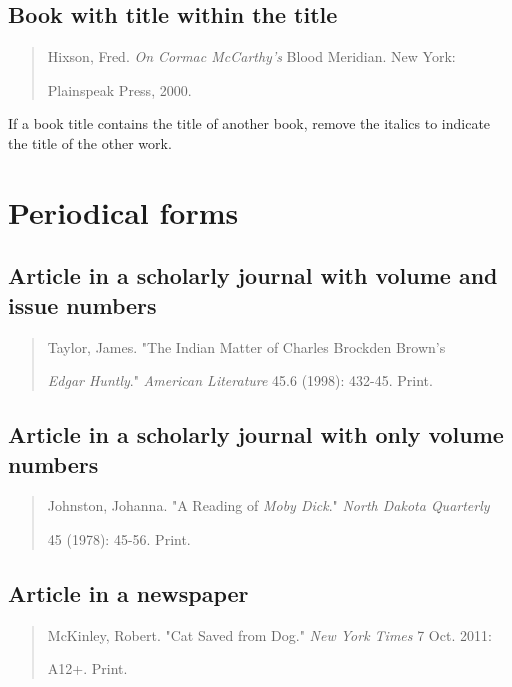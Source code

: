 \subsection{Book with title within the title}
\begin{quote}
Hixson, Fred. \emph{On Cormac McCarthy's }Blood Meridian. New York: 

\hspace{.4in}Plainspeak Press, 2000.
\end{quote}
 If a book title contains the title of another book, remove the italics to indicate the title
of the other work.



\section{Periodical forms}

\subsection{Article in a scholarly journal with volume and issue numbers}
\begin{quote}
Taylor, James. "The Indian Matter of Charles Brockden Brown's

\hspace{.4in}\emph{Edgar Huntly}." \emph{American Literature} 45.6 (1998): 432-45. Print.
\end{quote}


\subsection{Article in a scholarly journal with only volume numbers}
\begin{quote}
Johnston, Johanna. "A Reading of \emph{Moby Dick}." \emph{North Dakota Quarterly}  

\hspace{.4in}45 (1978): 45-56. Print.
\end{quote}

\subsection{Article in a newspaper}
\begin{quote}
McKinley, Robert. "Cat Saved from Dog." \emph{New York Times} 7 Oct. 2011:

\hspace{.4in}A12+. Print.
\end{quote}


